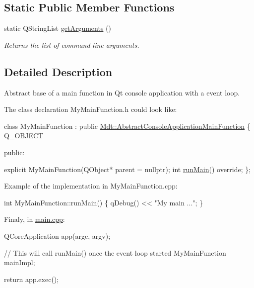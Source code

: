 \subsection*{Static Public Member Functions}
\begin{DoxyCompactItemize}
\item 
static Q\+String\+List \hyperlink{class_mdt_1_1_abstract_console_application_main_function_a4bfe1909139f3c30b03797f7778290fb}{get\+Arguments} ()
\begin{DoxyCompactList}\small\item\em Returns the list of command-\/line arguments. \end{DoxyCompactList}\end{DoxyCompactItemize}


\subsection{Detailed Description}
Abstract base of a main function in Qt console application with a event loop. 

The class declaration My\+Main\+Function.\+h could look like\+: 
\begin{DoxyCode}
\textcolor{keyword}{class }MyMainFunction : \textcolor{keyword}{public} \hyperlink{class_mdt_1_1_abstract_console_application_main_function}{Mdt::AbstractConsoleApplicationMainFunction}
\{
 Q\_OBJECT

 \textcolor{keyword}{public}:

  \textcolor{keyword}{explicit} MyMainFunction(QObject* parent = \textcolor{keyword}{nullptr});
  \textcolor{keywordtype}{int} \hyperlink{class_mdt_1_1_abstract_console_application_main_function_a34213b6ac2188b3620f5c2f5ce4ee287}{runMain}() \textcolor{keyword}{override};
\};
\end{DoxyCode}


Example of the implementation in My\+Main\+Function.\+cpp\+: 
\begin{DoxyCode}
\textcolor{keywordtype}{int} MyMainFunction::runMain()
\{
  qDebug() << \textcolor{stringliteral}{"My main ..."};
\}
\end{DoxyCode}


Finaly, in \hyperlink{main_8cpp_source}{main.\+cpp}\+: 
\begin{DoxyCode}
QCoreApplication app(argc, argv);

\textcolor{comment}{// This will call runMain() once the event loop started}
MyMainFunction mainImpl;

\textcolor{keywordflow}{return} app.exec();
\end{DoxyCode}
 


